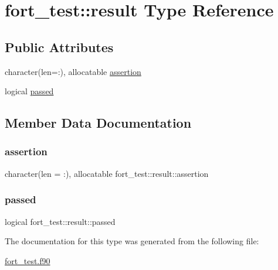 \hypertarget{structfort__test_1_1result}{}\section{fort\+\_\+test\+:\+:result Type Reference}
\label{structfort__test_1_1result}
\subsection*{Public Attributes}
\begin{DoxyCompactItemize}
\item 
character(len=\+:), allocatable \hyperlink{structfort__test_1_1result_af64f1b773949602c8d6342264140a77a}{assertion}
\item 
logical \hyperlink{structfort__test_1_1result_ab18a5a3688fc4a967bfaf598772672db}{passed}
\end{DoxyCompactItemize}


\subsection{Member Data Documentation}
\mbox{\label{structfort__test_1_1result_af64f1b773949602c8d6342264140a77a}} 
\subsubsection{\texorpdfstring{assertion}{assertion}}
{\footnotesize\ttfamily character(len = \+:), allocatable fort\+\_\+test\+::result\+::assertion}

\mbox{\label{structfort__test_1_1result_ab18a5a3688fc4a967bfaf598772672db}} 
\subsubsection{\texorpdfstring{passed}{passed}}
{\footnotesize\ttfamily logical fort\+\_\+test\+::result\+::passed}



The documentation for this type was generated from the following file\+:\begin{DoxyCompactItemize}
\item 
\hyperlink{fort__test_8f90}{fort\+\_\+test.\+f90}\end{DoxyCompactItemize}

